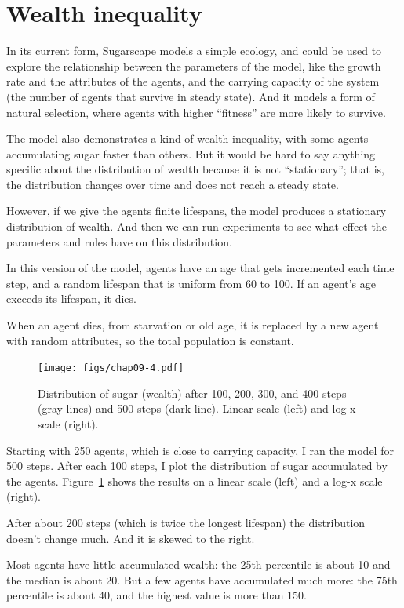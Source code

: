 \documentclass[12pt]{book}
\theoremstyle{exercise}
\begin{document}
\section{Wealth inequality}

In its current form, Sugarscape models a simple ecology, and could
be used to explore the relationship between the parameters of the
model, like the growth rate and the attributes of the agents, and
the carrying capacity of the system (the number of agents that
survive in steady state).  And it models a form of natural selection,
where agents with higher ``fitness'' are more likely to survive.

The model also demonstrates a kind of wealth inequality, with some
agents accumulating sugar faster than others.  But it would be hard
to say anything specific about the distribution of wealth because it
is not ``stationary''; that is, the distribution changes over time and
does not reach a steady state.

However, if we give the agents finite lifespans, the model produces
a stationary distribution of wealth.  And then we can run experiments to
see what effect the parameters and rules have on this distribution.

In this version of the model, agents have an age that gets incremented
each time step, and a random lifespan that is uniform from 60 to 100.
If an agent's age exceeds its lifespan, it dies.

When an agent dies, from starvation or old age, it is replaced by
a new agent with random attributes, so the total population is
constant.

\begin{figure}
\centerline{\texttt{[image: figs/chap09-4.pdf]}}
\caption{Distribution of sugar (wealth) after 100, 200, 300, and
400 steps (gray lines) and 500 steps (dark line).  Linear scale (left)
and log-x scale (right). }
\label{chap09-4}
\end{figure}

Starting with 250 agents, which is close to carrying capacity, I ran
the model for 500 steps.  After each 100 steps, I plot the distribution
of sugar accumulated by the agents.  Figure~\ref{chap09-4} shows the
results on a linear scale (left) and a log-x scale (right).

After about 200 steps (which is twice the longest lifespan) the
distribution doesn't change much.  And it is skewed to the right.

Most agents have little accumulated wealth: the 25th percentile is
about 10 and the median is about 20.  But a few agents have accumulated
much more: the 75th percentile is about 40, and the highest value is
more than 150.
\end{document}
